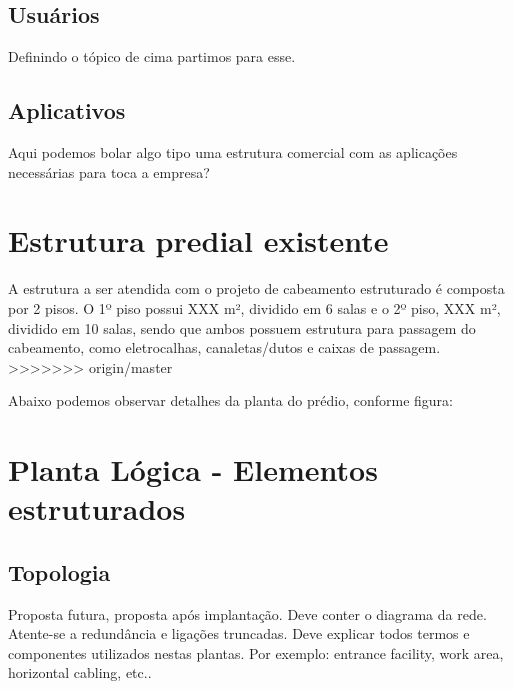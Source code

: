 \documentclass[	DIV=calc,%
							paper=a4,%
							fontsize=12pt,%
							onecolumn]{scrartcl}	 					%
\begin{document}

 

\subsection{Usuários}
Definindo o tópico de cima partimos para esse.


\subsection{Aplicativos}
Aqui podemos bolar algo tipo uma estrutura comercial com as aplicações necessárias para toca a empresa?


\section{Estrutura predial existente}

A estrutura a ser atendida com o projeto de cabeamento estruturado é composta por 2 pisos. O 1º piso possui XXX m², dividido em 6 salas e o 2º piso, XXX m², dividido em 10 salas, sendo que ambos possuem estrutura para passagem do cabeamento, como eletrocalhas, canaletas/dutos e caixas de passagem. 
>>>>>>> origin/master

Abaixo podemos observar detalhes da planta do prédio, conforme figura:


\section{Planta Lógica - Elementos estruturados}


\subsection{Topologia}
Proposta futura, proposta após implantação.
Deve conter o diagrama da rede. Atente-se a redundância  e ligações truncadas.
Deve explicar todos termos e componentes utilizados nestas plantas. Por exemplo: entrance facility, work area, horizontal cabling, etc..
\end{document}
